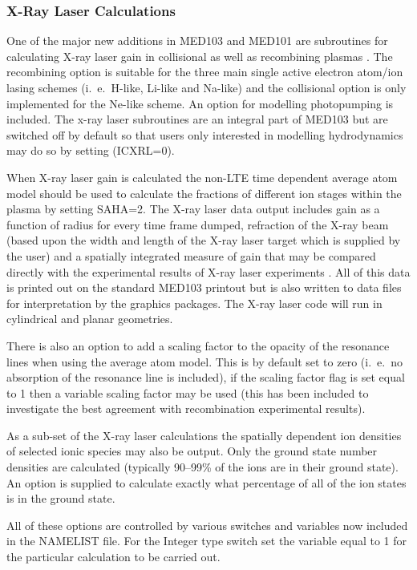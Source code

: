 \subsubsection{\bf X-Ray Laser Calculations}
\newline
One of the major new additions in MED103 and MED101 are subroutines for calculating
X-ray laser gain in collisional \cite{djaoui2} as well as recombining plasmas \cite{sjr}.
The recombining option  is suitable for the three main single active
electron atom/ion lasing schemes (i.\ e.\ H-like, Li-like and Na-like) and the collisional
option is only implemented for the Ne-like scheme.
An option for
modelling photopumping is included.
The x-ray laser subroutines are an integral part of MED103 but are switched
off by default so that users only interested in modelling
hydrodynamics may do so by setting (ICXRL=0).

 
When X-ray laser gain is calculated the non-LTE time dependent average atom model should be used to
calculate the fractions of different ion stages within the plasma by setting SAHA=2.
The X-ray laser data output includes
gain as a function of radius for every time frame dumped, refraction
of the X-ray beam (based upon the width and length of the X-ray laser
target which is supplied by the user)
and a spatially integrated measure of
gain that may be compared directly with the experimental results of X-ray
laser experiments \cite{sjr}.
All of this data is printed out on the standard MED103
printout but is also written to data files for interpretation by the
graphics packages. The X-ray laser code will
run in cylindrical and planar
geometries.
 
There is also an option to add a scaling factor to
the opacity of the resonance lines
when using the average atom model. This is by default set to zero (i.\ e.\
no absorption of the resonance line is included),
if the scaling factor
flag is set equal to 1 then a variable scaling factor may be used
(this has been included to investigate the best agreement with
recombination experimental results).
 
As a sub-set of the X-ray laser calculations the spatially
dependent ion densities
of selected ionic species may also be output. Only the ground state
number densities are calculated (typically 90--99\% of the ions are
in their ground state).
An option is supplied to calculate
exactly what percentage of all of the ion states is in the
ground state.
 
All of these options are
controlled by various switches and variables now included in the NAMELIST
file. For the Integer type switch set the variable equal to 1 for
the particular calculation to be carried out.
 
